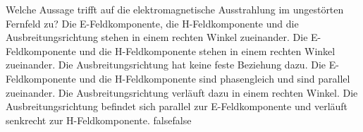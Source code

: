     {Welche Aussage trifft auf die elektromagnetische Ausstrahlung im ungestörten Fernfeld zu?}
    {Die E-Feldkomponente, die H-Feldkomponente und die Ausbreitungsrichtung stehen in einem rechten Winkel zueinander.}
    {Die E-Feldkomponente und die H-Feldkomponente stehen in einem rechten Winkel zueinander. Die Ausbreitungsrichtung hat keine feste Beziehung dazu.}
    {Die E-Feldkomponente und die H-Feldkomponente sind phasengleich und sind parallel zueinander. Die Ausbreitungsrichtung verläuft dazu in einem rechten Winkel.}
    {Die Ausbreitungsrichtung befindet sich parallel zur E-Feldkomponente und verläuft senkrecht zur H-Feldkomponente.}
    {false}{false}